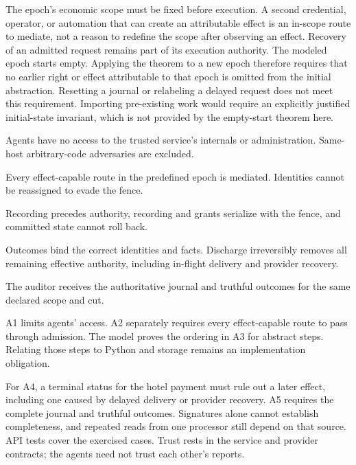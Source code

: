\documentclass[11pt]{article}
\begin{document}
The epoch's economic scope must be fixed before execution. A second credential,
operator, or automation that can create an attributable effect is an in-scope
route to mediate, not a reason to redefine the scope after observing an effect.
Recovery of an admitted request remains part of its execution authority.
The modeled epoch starts empty. Applying the theorem to a new epoch therefore
requires that no earlier right or effect attributable to that epoch is omitted
from the initial abstraction. Resetting a journal or relabeling a delayed
request does not meet this requirement. Importing pre-existing work would
require an explicitly justified initial-state invariant, which is not provided
by the empty-start theorem here.

\begin{description}[style=nextline]
\item[A1: Request-only agents.] Agents have no access to the trusted service's
internals or administration. Same-host arbitrary-code adversaries are excluded.
\item[A2: Exclusive scoped activation.] Every effect-capable route in the
predefined epoch is mediated. Identities cannot be reassigned to evade the fence.
\item[A3: Durable ordered service.] Recording precedes authority, recording
and grants serialize with the fence, and committed state cannot roll back.
\item[A4: Truthful source terminality.] Outcomes bind the correct identities
and facts. Discharge irreversibly removes all remaining effective authority,
including in-flight delivery and provider recovery.
\item[A5: Faithful complete export.] The auditor receives the authoritative
journal and truthful outcomes for the same declared scope and cut.
\end{description}

\begin{samepage}
A1 limits agents' access. A2 separately requires every effect-capable route to
pass through admission. The model proves the ordering in A3 for abstract steps. Relating those steps to Python and storage remains an implementation
obligation.

For A4, a terminal status for the hotel payment must rule out a later effect,
including one caused by delayed delivery or provider recovery. A5 requires the
complete journal and truthful outcomes. Signatures alone cannot establish
completeness, and repeated reads from one processor still depend on that source.
API tests cover the exercised cases. Trust rests in the service and provider
contracts; the agents need not trust each other's reports.\par
\end{samepage}
\end{document}
